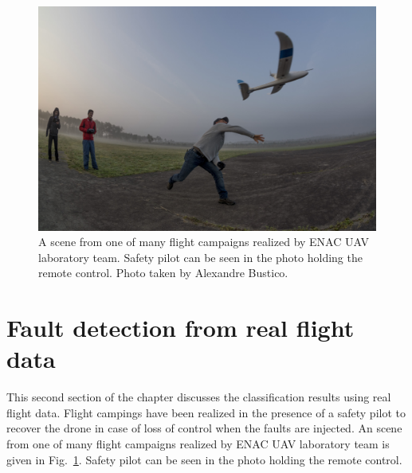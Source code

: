 
\begin{figure}
\begin{center}
\includegraphics[width=1\textwidth]{figures/flightCampaign}    %
\caption{A scene from one of many flight campaigns realized by ENAC UAV laboratory team. Safety pilot can be seen in the photo holding the remote control. Photo taken by Alexandre Bustico.} 
\label{fig:flightCampaign}
\end{center}
\end{figure}

\section{Fault detection from real flight data}

This second section of the chapter discusses the classification results using real flight data. 
Flight campings have been realized in the presence of a safety pilot to recover the drone in case of loss of control when the faults are injected. 
An scene from one of many flight campaigns realized by ENAC UAV laboratory team is given in Fig.~\ref{fig:flightCampaign}. 
Safety pilot can be seen in the photo holding the remote control.

